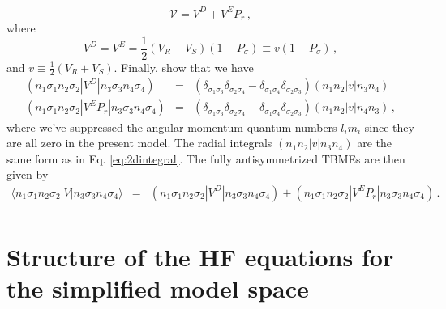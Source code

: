 \documentclass[letterpaper,12pt]{article}
\begin{document}
\begin{enumerate}
\begin{equation}
\mathcal{V} = V^D + V^EP_r\,,               
\end{equation}
where
\begin{equation}
V^D=V^E =\frac{1}{2}(V_R+V_S)(1-P_{\sigma}) \equiv v(1-P_{\sigma})\,,
\end{equation}
and $v\equiv \frac{1}{2}(V_R+V_S)$. Finally, show that we have 
\begin{eqnarray}
(n_1\sigma_1n_2\sigma_2|V^D|n_3\sigma_3n_4\sigma_4) &=& (\delta_{\sigma_1\sigma_3}\delta_{\sigma_2\sigma_4}-\delta_{\sigma_1\sigma_4}\delta_{\sigma_2\sigma_3})(n_1n_2|v|n_3n_4)\\
(n_1\sigma_1n_2\sigma_2|V^EP_r|n_3\sigma_3n_4\sigma_4) &=& (\delta_{\sigma_1\sigma_3}\delta_{\sigma_2\sigma_4}-\delta_{\sigma_1\sigma_4}\delta_{\sigma_2\sigma_3})(n_1n_2|v|n_4n_3)\,,
\end{eqnarray}
where we've suppressed the angular momentum quantum numbers $l_im_i$ since they are all zero in the present model. The radial integrals $(n_1n_2|v|n_3n_4)$ are the same form as in Eq. \ref{eq:2dintegral}. The fully antisymmetrized TBMEs are then given by
\begin{eqnarray}
\langle n_1\sigma_1n_2\sigma_2|V|n_3\sigma_3n_4\sigma_4\rangle &=& (n_1\sigma_1n_2\sigma_2|V^D|n_3\sigma_3n_4\sigma_4) + (n_1\sigma_1n_2\sigma_2|V^EP_r|n_3\sigma_3n_4\sigma_4)\nonumber\,.\\ 
\end{eqnarray}
\end{enumerate}


\section{Structure of the HF equations for the simplified model space}
\end{document}
